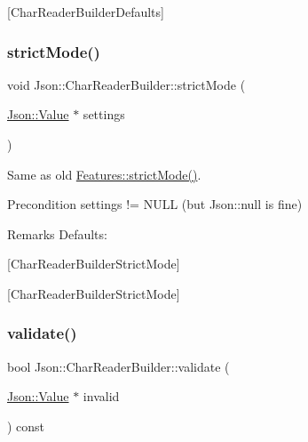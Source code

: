 \mbox{[}Char\+Reader\+Builder\+Defaults\mbox{]} \mbox{\label{classJson_1_1CharReaderBuilder_a9c19e3c5475f9072d527810d4bf56749}} 
\subsubsection{\texorpdfstring{strict\+Mode()}{strictMode()}}
{\footnotesize\ttfamily void Json\+::\+Char\+Reader\+Builder\+::strict\+Mode (\begin{DoxyParamCaption}\item[{\hyperlink{classJson_1_1Value}{Json\+::\+Value} $\ast$}]{settings }\end{DoxyParamCaption})\hspace{0.3cm}{\ttfamily [static]}}

Same as old \hyperlink{classJson_1_1Features_ae23176c14b2e79e81fb61fb1a8ab58ee}{Features\+::strict\+Mode()}. \begin{DoxyPrecond}{Precondition}
\textquotesingle{}settings\textquotesingle{} != N\+U\+LL (but Json\+::null is fine) 
\end{DoxyPrecond}
\begin{DoxyRemark}{Remarks}
Defaults\+: 
\begin{DoxyCodeInclude}
\end{DoxyCodeInclude}

\end{DoxyRemark}
\mbox{[}Char\+Reader\+Builder\+Strict\+Mode\mbox{]}

\mbox{[}Char\+Reader\+Builder\+Strict\+Mode\mbox{]} \mbox{\label{classJson_1_1CharReaderBuilder_af890b5cb70e9b372e41de5c9e6535d21}} 
\subsubsection{\texorpdfstring{validate()}{validate()}}
{\footnotesize\ttfamily bool Json\+::\+Char\+Reader\+Builder\+::validate (\begin{DoxyParamCaption}\item[{\hyperlink{classJson_1_1Value}{Json\+::\+Value} $\ast$}]{invalid }\end{DoxyParamCaption}) const}

